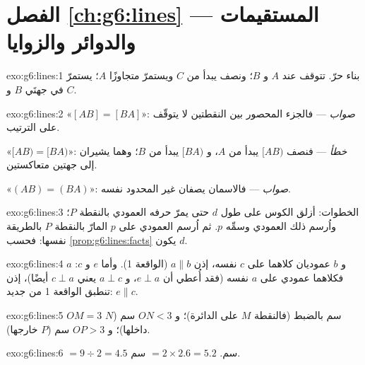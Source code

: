 \section*{الفصل \ref{ch:g6:lines} --- المستقيمات والدوائر والزوايا}

\begin{solution}{exo:g6:lines:1}
بناء حرّ.  تتوقف عند $A$ و $B$؛ ونصف  يبدأ من
$C$ ويستمرّ متجاوزًا $A$؛  يستمرّ في جهتَي $B$
و $C$.
\end{solution}

\begin{solution}{exo:g6:lines:2}
«$[AB] = [BA]$»: \emph{صواب} --- فالجزء المحصور بين النقطتين لا
يتوقّف على الترتيب.

«$[AB) = [BA)$»: \emph{خطأ} --- فنصف  $[AB)$ يبدأ من $A$، و $[BA)$ يبدأ
من $B$؛ وهما يشيران إلى جهتين متعاكستين.

«$(AB) = (BA)$»: \emph{صواب} --- فالاسمان يصفان 
غير المحدود نفسه.
\end{solution}

\begin{solution}{exo:g6:lines:3}
الخطوات: أزلق الكوس على طول $d$ حتى يمرّ حرفه العمودي
بالنقطة $P$؛ واُرسم ذلك العمودي وسمِّه $p$. ثم اُرسم
العمودي على $p$ المارّ بالنقطة $P$ بالطريقة نفسها: فحسب
\cref{prop:g6:lines:facts} يكون   $d$.
\end{solution}

\begin{solution}{exo:g6:lines:4}
 $a$ و $b$ عموديان كلاهما على  $c$ نفسه، إذن
$a \parallel b$ (الواقعة 1). وأما $e$ و $c$: فكلاهما عمودي على
 $a$ نفسه (فقد أُعطي أن $e \perp a$، و $a \perp c$ يعني
$c \perp a$ أيضًا)، إذن تنطبق الواقعة 1 من جديد: $e \parallel c$.
\end{solution}

\begin{solution}{exo:g6:lines:5}
$OM = 3$ سم بالضبط (فالنقطة $M$ على الدائرة)؛ و $ON < 3$ سم ($N$ داخلها)؛
و $OP > 3$ سم ($P$ خارجها).
\end{solution}

\begin{solution}{exo:g6:lines:6}
 $= 9 \div 2 = 4.5$ سم. \quad {} $= 2 \times 2.6 = 5.2$ سم.
\end{solution}

